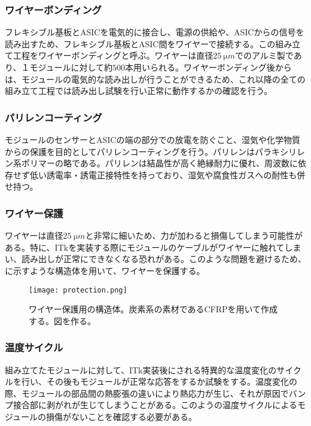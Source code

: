 \subsubsection*{ワイヤーボンディング}

フレキシブル基板とASICを電気的に接合し、電源の供給や、ASICからの信号を読み出すため、フレキシブル基板とASIC間をワイヤーで接続する。この組み立て工程をワイヤーボンディングと呼ぶ。ワイヤーは直径$25\ \si{\micro m}$でのアルミ製であり、１モジュールに対して約$500$本用いられる。ワイヤーボンディング後からは、モジュールの電気的な読み出しが行うことができるため、これ以降の全ての組み立て工程では読み出し試験を行い正常に動作するかの確認を行う。

\subsubsection*{パリレンコーティング}

モジュールのセンサーとASICの端の部分での放電を防ぐこと、湿気や化学物質からの保護を目的としてパリレンコーティングを行う。パリレンはパラキシリレン系ポリマーの略である。パリレンは結晶性が高く絶縁耐力に優れ、周波数に依存せず低い誘電率・誘電正接特性を持っており、湿気や腐食性ガスへの耐性も併せ持つ。


\subsubsection*{ワイヤー保護}

ワイヤーは直径$25\ \si{\micro m}$と非常に細いため、力が加わると損傷してしまう可能性がある。特に、ITkを実装する際にモジュールのケーブルがワイヤーに触れてしまい、読み出しが正常にできなくなる恐れがある。このような問題を避けるため、に示すような構造体を用いて、ワイヤーを保護する。

\begin{figure}[tbp]
  \centering
  \texttt{[image: protection.png]}
  \caption[ワイヤー保護用の構造体]{ワイヤー保護用の構造体。炭素系の素材であるCFRPを用いて作成する。図を作る。 }
  \label{fig:protection}
\end{figure}

\subsubsection*{温度サイクル}


組み立てたモジュールに対して、ITk実装後にされる特異的な温度変化のサイクルを行い、その後もモジュールが正常な応答をするか試験をする。温度変化の際、モジュールの部品間の熱膨張の違いにより熱応力が生じ、それが原因でバンプ接合部に剥がれが生じてしまうことがある。このようの温度サイクルによるモジュールの損傷がないことを確認する必要がある。

